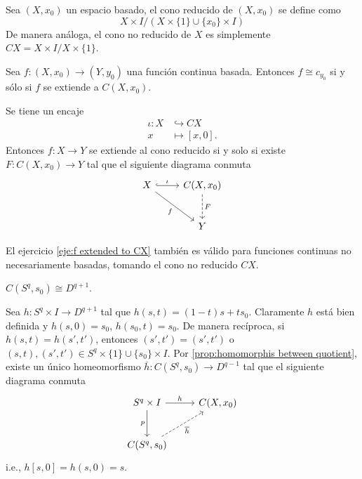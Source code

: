 \begin{definicion}
    Sea $(X,x_0)$ un espacio basado, el cono reducido de $(X,x_0)$ se define como
    \begin{equation*}
        X\times I/(X\times\{1\}\cup\{x_0\}\times I)
    \end{equation*}
    De manera análoga, el cono no reducido de $X$ es simplemente $CX=X\times I/X\times\{1\}$.
\end{definicion}
\begin{ejercicio}
\label{eje:f extended to CX}
    Sea $f:(X,x_0)\to(Y,y_0)$ una función continua basada. Entonces $f\cong c_{y_0}$ si y sólo si $f$ se extiende a $C(X,x_0)$.
\end{ejercicio}
\begin{nota}
    Se tiene un encaje 
    \begin{align*}
        \iota:X&\hookrightarrow CX\\
        x&\mapsto [x,0].
    \end{align*}
    Entonces $f:X\to Y$ se extiende al cono reducido si y solo si existe $F:C(X,x_0)\to Y$ tal que el siguiente diagrama conmuta
    \begin{equation*}
        \begin{tikzcd}[row sep=0.9cm]
            X\arrow[r,"\iota",hook]\arrow[dr,"f"'] & C(X,x_0)\arrow[d,"F",dashed]\\
            & Y
        \end{tikzcd}
    \end{equation*}
\end{nota}
\begin{nota}
    El ejercicio \ref{eje:f extended to CX} también es válido para funciones continuas no necesariamente basadas, tomando el cono no reducido $CX$.
\end{nota}
\begin{lema}
\label{lema: C(S^q,s_0) cong Dq+1}
    $C(S^q,s_0)\cong D^{q+1}$.
\end{lema}
\begin{dem}
    Sea $h:S^q\times I\to D^{q+1}$ tal que $h(s,t)=(1-t)s+ts_0.$ Claramente $h$ está bien definida y
    $h(s,0)=s_0$, $h(s_0,t)=s_0$. De manera recíproca, si $h(s,t)=h(s',t')$, entonces $(s',t')=(s',t')$ o $(s,t),(s',t')\in S^q\times\{1\}\cup\{s_0\}\times I$. Por \ref{prop:homomorphis between quotient}, existe un único homeomorfismo $\overline{h}:C(S^q,s_0)\to D^{q-1}$ tal que el siguiente diagrama conmuta
    \begin{equation*}
        \begin{tikzcd}[row sep=0.9cm]
            S^q\times I\arrow[r,"h"]\arrow[d,"p"'] & C(X,x_0)\\
            C(S^q,s_0) \arrow[ur,"\overline{h}"',dashed]
        \end{tikzcd}
    \end{equation*}
    i.e., $h[s,0]=h(s,0)=s.$
\end{dem}
